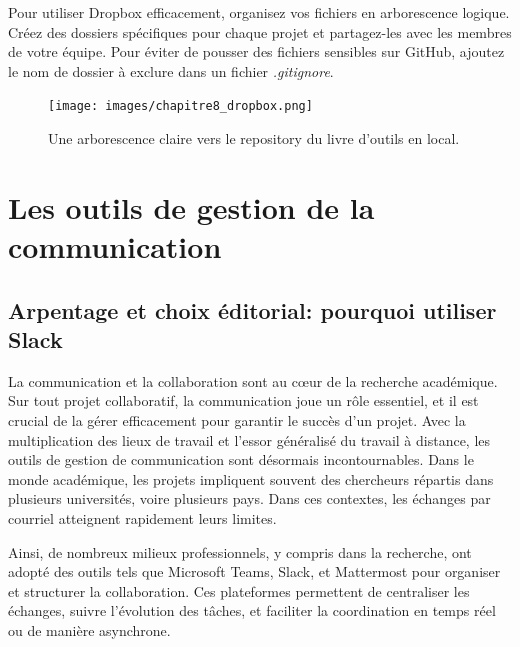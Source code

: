 \documentclass[
  letterpaper,
  DIV=11,
  numbers=noendperiod]{scrreprt}
\begin{document}
Pour utiliser Dropbox efficacement, organisez vos fichiers en
arborescence logique. Créez des dossiers spécifiques pour chaque projet
et partagez-les avec les membres de votre équipe. Pour éviter de pousser
des fichiers sensibles sur GitHub, ajoutez le nom de dossier à exclure
dans un fichier \emph{.gitignore}.

\begin{figure}

{\centering \texttt{[image: images/chapitre8\_dropbox.png]}

}

\caption{\label{fig-dropbox}Une arborescence claire vers le repository
du livre d'outils en local.}

\end{figure}

\hypertarget{les-outils-de-gestion-de-la-communication}{%
\section{Les outils de gestion de la
communication}\label{les-outils-de-gestion-de-la-communication}}

\hypertarget{arpentage-et-choix-uxe9ditorial-pourquoi-utiliser-slack}{%
\subsection{Arpentage et choix éditorial: pourquoi utiliser
Slack}\label{arpentage-et-choix-uxe9ditorial-pourquoi-utiliser-slack}}

La communication et la collaboration sont au cœur de la recherche
académique. Sur tout projet collaboratif, la communication joue un rôle
essentiel, et il est crucial de la gérer efficacement pour garantir le
succès d'un projet. Avec la multiplication des lieux de travail et
l'essor généralisé du travail à distance, les outils de gestion de
communication sont désormais incontournables. Dans le monde académique,
les projets impliquent souvent des chercheurs répartis dans plusieurs
universités, voire plusieurs pays. Dans ces contextes, les échanges par
courriel atteignent rapidement leurs limites.

Ainsi, de nombreux milieux professionnels, y compris dans la recherche,
ont adopté des outils tels que Microsoft Teams, Slack, et Mattermost
pour organiser et structurer la collaboration. Ces plateformes
permettent de centraliser les échanges, suivre l'évolution des tâches,
et faciliter la coordination en temps réel ou de manière asynchrone.
\end{document}
